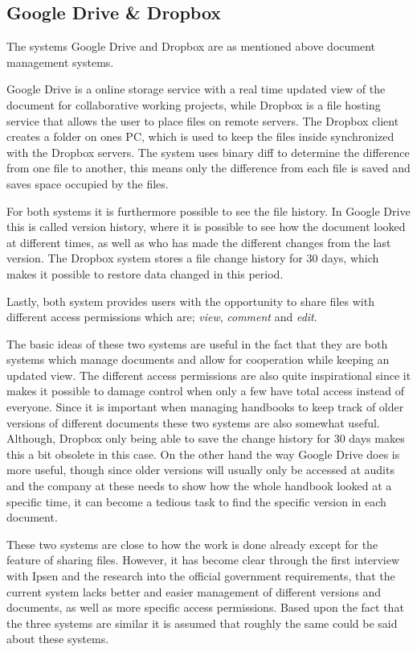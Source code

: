 \subsection{Google Drive \& Dropbox}\label{sec:DropDrive}
The systems Google Drive and Dropbox are as mentioned above document management systems.

Google Drive is a online storage service with a real time updated view of the document for collaborative working projects, while Dropbox is a file hosting service that allows the user to place files on remote servers.
The Dropbox client creates a folder on ones PC, which is used to keep the files inside synchronized with the Dropbox servers. 
The system uses binary diff to determine the difference from one file to another, this means only the difference from each file is saved and saves space occupied by the files\cite{DropboxDiff}.

For both systems it is furthermore possible to see the file history.
In Google Drive this is called version history, where it is possible to see how the document looked at different times, as well as who has made the different changes from the last version.
The Dropbox system stores a file change history for 30 days, which makes it possible to restore data changed in this period.

Lastly, both system provides users with the opportunity to share files with different access permissions which are; \textit{view}, \textit{comment} and \textit{edit}.

The basic ideas of these two systems are useful in the fact that they are both systems which manage documents and allow for cooperation while keeping an updated view.
The different access permissions are also quite inspirational since it makes it possible to damage control when only a few have total access instead of everyone.
Since it is important when managing handbooks to keep track of older versions of different documents these two systems are also somewhat useful.
Although, Dropbox only being able to save the change history for 30 days makes this a bit obsolete in this case.
On the other hand the way Google Drive does is more useful, though since older versions will usually only be accessed at audits and the company at these needs to show how the whole handbook looked at a specific time, it can become a tedious task to find the specific version in each document.


These two systems are close to how the work is done already except for the feature of sharing files.
However, it has become clear through the first interview with Ipsen and the research into the official government requirements, that the current system lacks better and easier management of different versions and documents, as well as more specific access permissions. 
Based upon the fact that the three systems are similar it is assumed that roughly the same could be said about these systems.